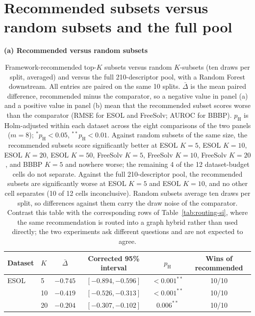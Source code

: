 \documentclass[10pt,a4paper]{article}
\renewcommand{\thetable}{S\arabic{table}}
\begin{document}
\section*{Recommended subsets versus random subsets and the full pool}

\begin{table}[H]
\renewcommand{\thetable}{S4}
\caption{Framework-recommended top-$K$ subsets versus random $K$-subsets (ten draws per split, averaged) and versus the full 210-descriptor pool, with a Random Forest downstream. All entries are paired on the same 10 splits. $\bar\Delta$ is the mean paired difference, recommended minus the comparator, so a negative value in panel (a) and a positive value in panel (b) mean that the recommended subset scores worse than the comparator (RMSE for ESOL and FreeSolv; AUROC for BBBP). $p_{\mathrm{H}}$ is Holm-adjusted within each dataset across the eight comparisons of the two panels ($m=8$); $^{*}p_{\mathrm{H}}<0.05$, $^{**}p_{\mathrm{H}}<0.01$. Against random subsets of the same size, the recommended subsets score significantly better at ESOL $K=5$, ESOL $K=10$, ESOL $K=20$, ESOL $K=50$, FreeSolv $K=5$, FreeSolv $K=10$, FreeSolv $K=20$, and BBBP $K=5$ and nowhere worse; the remaining 4 of the 12 dataset-budget cells do not separate. Against the full 210-descriptor pool, the recommended subsets are significantly worse at ESOL $K=5$ and ESOL $K=10$, and no other cell separates (10 of 12 cells inconclusive). Random subsets average ten draws per split, so differences against them carry the draw noise of the comparator. Contrast this table with the corresponding rows of Table~\ref{tab:routing-si}, where the same recommendation is routed into a graph hybrid rather than used directly; the two experiments ask different questions and are not expected to agree.}\label{tab:rec-random}
\centering\scriptsize
\setlength{\tabcolsep}{4pt}
\textbf{(a) Recommended versus random subsets}\par\smallskip
\begin{tabular}{@{}llcccc@{}}
\toprule
Dataset & $K$ & $\bar\Delta$ & Corrected 95\% interval & $p_{\mathrm{H}}$ & Wins of recommended \\
\midrule
ESOL & 5 & $-0.745$ & $[-0.894,-0.596]$ & $<0.001^{**}$ & 10/10 \\
 & 10 & $-0.419$ & $[-0.526,-0.313]$ & $<0.001^{**}$ & 10/10 \\
 & 20 & $-0.204$ & $[-0.307,-0.102]$ & $0.006^{**}$ & 10/10 \\

\end{tabular}
\end{table}
\end{document}
